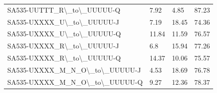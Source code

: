 \begin{table}[htbp]
\begin{tabular}{|l|l|l|l|}
     SA535-UUTTT\_R\textbackslash{}\_to\textbackslash{}\_UUUUU-Q & 7.92 & 4.85 & 87.23 \\
     SA535-UXXXX\_U\textbackslash{}\_to\textbackslash{}\_UUUUU-J & 7.19 & 18.45 & 74.36 \\
     SA535-UXXXX\_U\textbackslash{}\_to\textbackslash{}\_UUUUU-Q & 11.84 & 11.59 & 76.57 \\
     SA535-UXXXX\_R\textbackslash{}\_to\textbackslash{}\_UUUUU-J & 6.8 & 15.94 & 77.26 \\
     SA535-UXXXX\_R\textbackslash{}\_to\textbackslash{}\_UUUUU-Q & 14.37 & 10.06 & 75.57 \\
     SA535-UXXXX\_M\_N\_O\textbackslash{}\_to\textbackslash{}\_UUUUU-J & 4.53 & 18.69 & 76.78 \\
     SA535-UXXXX\_M\_N\_O\textbackslash{}\_to\textbackslash{}\_UUUUU-Q & 9.27 & 12.36 & 78.37 \\
   \hline 
     \end{tabular}%
   
   \label{tab:copynumberchange}%
   
 \end{table}%













